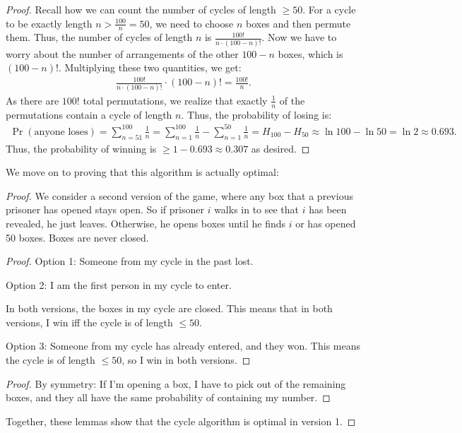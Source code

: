 \documentclass{report}
\begin{document}
\begin{proof}
Recall how we can count the number of cycles of length $\geq 50$. For a cycle to be exactly length $n > \frac{100}n = 50$, we need to choose $n$ boxes and then permute them. Thus, the number of cycles of length $n$ is $\frac{100!}{n \cdot (100 - n)!}$. Now we have to worry about the number of arrangements of the other $100-n$ boxes, which is $(100-n)!$. Multiplying these two quantities, we get:
\begin{align*}
    \frac{100!}{n \cdot (100-n)!} \cdot (100-n)! = \frac{100!}{n}.
\end{align*}
As there are $100!$ total permutations, we realize that exactly $\frac 1n$ of the permutations contain a cycle of length $n$. Thus, the probability of losing is:
\begin{align*}
    \Pr(\text{anyone loses}) = \sum_{n=51}^{100} \frac{1}{n} = \sum_{n=1}^{100} \frac 1n - \sum_{n=1}^{50} \frac 1n = H_{100} - H_{50}\approx \ln 100 - \ln 50 = \ln 2 \approx 0.693.
\end{align*}
Thus, the probability of winning is $\geq 1 - 0.693 \approx 0.307$ as desired.

\end{proof}

\noindent We move on to proving that this algorithm is actually optimal:
\begin{proof}
    We consider a second version of the game, where any box that a previous prisoner has opened stays open. So if prisoner $i$ walks in to see that $i$ has been revealed, he just leaves. Otherwise, he opens boxes until he finds $i$ or has opened 50 boxes. Boxes are never closed. 
    \begin{proof}
        Option 1: Someone from my cycle in the past lost. 

        Option 2: I am the first person in my cycle to enter.

        In both versions, the boxes in my cycle are closed. This means that in both versions, I win iff the cycle is of length $\leq 50$.

        Option 3: Someone from my cycle has already entered, and they won. This means the cycle is of length $\leq 50$, so I win in both versions. 
    \end{proof}
    \begin{proof}
        By symmetry: If I'm opening a box, I have to pick out of the remaining boxes, and they all have the same probability of containing my number. 
    \end{proof}
    Together, these lemmas show that the cycle algorithm is optimal in version 1. 
\end{proof}
\end{document}

